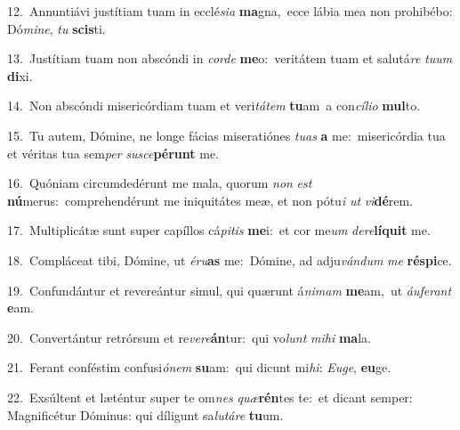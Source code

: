 {\numbfont\textcolor{\numbcolor}{12.}}~Annuntiávi justítiam tuam in ecclé\-\textit{si}\-\textit{a} \textbf{ma}\-gna,~\star ecce lábia mea non prohibébo: Dó\-\textit{mi}\-\textit{ne}, \textit{tu} \textbf{scis}\-ti.\par
{\numbfont\textcolor{\numbcolor}{13.}}~Justítiam tuam non abscóndi in \textit{cor}\-\textit{de} \textbf{me}\-o:~\star veritátem tuam et salutá\textit{re} \textit{tu}\-\textit{um} \textbf{di}\-xi.\par
{\numbfont\textcolor{\numbcolor}{14.}}~Non abscóndi misericórdiam tuam et veri\-\textit{tá}\-\textit{tem} \textbf{tu}\-am~\star a con\-\textit{cí}\-\textit{li}\textit{o} \textbf{mul}\-to.\par
{\numbfont\textcolor{\numbcolor}{15.}}~Tu autem, Dómine, ne longe fácias miseratiónes \textit{tu}\-\textit{as} \textbf{a} me:~\star misericórdia tua et véritas tua sem\textit{per} \textit{su}\-\textit{sce}\textbf{pé}\textbf{runt} me.\par
{\numbfont\textcolor{\numbcolor}{16.}}~Quóniam circumdedérunt me mala, quorum \textit{non} \textit{est} \textbf{nú}\-merus:~\star comprehendérunt me iniquitátes meæ, et non pótu\textit{i} \textit{ut} \textit{vi}\-\textbf{dé}rem.\par
{\numbfont\textcolor{\numbcolor}{17.}}~Multiplicátæ sunt super capíllos cá\-\textit{pi}\-\textit{tis} \textbf{me}\-i:~\star et cor me\textit{um} \textit{de}\-\textit{re}\textbf{lí}\textbf{quit} me.\par
{\numbfont\textcolor{\numbcolor}{18.}}~Compláceat tibi, Dómine, ut \textit{é}\-\textit{ru}\textbf{as} me:~\star Dómine, ad adju\-\textit{ván}\-\textit{dum} \textit{me} \textbf{ré}\-\textbf{spi}ce.\par
{\numbfont\textcolor{\numbcolor}{19.}}~Confundántur et revereántur simul, qui quærunt á\-\textit{ni}\-\textit{mam} \textbf{me}\-am,~\star ut \textit{áu}\-\textit{fe}\textit{rant} \textbf{e}\-am.\par
{\numbfont\textcolor{\numbcolor}{20.}}~Convertántur retrórsum et re\-\textit{ve}\-\textit{re}\textbf{án}tur:~\star qui vo\textit{lunt} \textit{mi}\-\textit{hi} \textbf{ma}\-la.\par
{\numbfont\textcolor{\numbcolor}{21.}}~Ferant conféstim confusi\-\textit{ó}\-\textit{nem} \textbf{su}\-am:~\star qui dicunt mi\-\textit{hi}\-: \textit{Eu}\-\textit{ge}, \textbf{eu}\-ge.\par
{\numbfont\textcolor{\numbcolor}{22.}}~Exsúltent et læténtur super te om\textit{nes} \textit{quæ}\-\textbf{rén}tes te:~\star et dicant semper: Magnificétur Dóminus: qui díligunt sa\-\textit{lu}\-\textit{tá}\textit{re} \textbf{tu}\-um.\par
